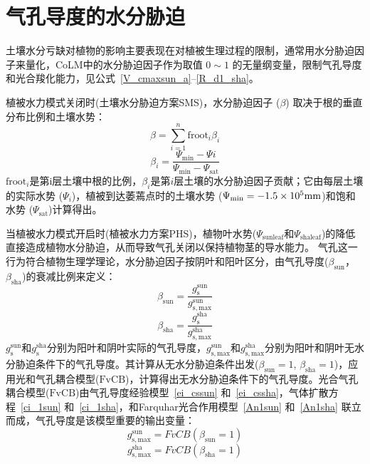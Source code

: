 \section{气孔导度的水分胁迫}\label{气孔导度的水分胁迫}
土壤水分亏缺对植物的影响主要表现在对植被生理过程的限制，通常用水分胁迫因子来量化，CoLM中的水分胁迫因子作为取值 $0\sim 1$ 的无量纲变量，限制气孔导度和光合羧化能力，见公式~\eqref{V_cmaxsun_a}--\eqref{R_d1_sha}。

植被水力模式关闭时(土壤水分胁迫方案SMS)，水分胁迫因子 ($\beta$) 取决于根的垂直分布比例和土壤水势：
\begin{equation}\label{beta_0}
  \beta=\sum_{i=1}^{n} {\mathrm {froot}}_i \beta_{i}
\end{equation}
%
\begin{equation}\label{beta_i}
  \beta_{i}=\frac{\Psi_{\mathrm{\min }}-\Psi i}{\Psi_{\mathrm{\min }}-\Psi_{\mathrm{s a t}}}
\end{equation}
${\mathrm {froot}}_i$是第i层土壤中根的比例，$\beta_i$是第$i$层土壤的水分胁迫因子贡献；它由每层土壤的实际水势 (${\Psi}_i$)，植被到达萎蔫点时的土壤水势 (${\Psi}_{\mathrm{min}}=-1.5\times 10^5 {\rm mm}$)和饱和水势 (${\Psi}_{\mathrm{sat}}$)计算得出。

当植被水力模式开启时(植被水力方案PHS)，植物叶水势($\Psi_{\mathrm{sunleaf}}$和$\Psi_{\mathrm{shaleaf}}$)的降低直接造成植物水分胁迫，从而导致气孔关闭以保持植物茎的导水能力。
气孔这一行为符合植物生理学理论，水分胁迫因子按阴叶和阳叶区分，由气孔导度($\beta_{\mathrm{sun}}$，$\beta_{\mathrm{sha}}$)的衰减比例来定义：
\begin{equation}\label{beta_sun}
  \beta_{\mathrm{sun}}=\frac{g_{\mathrm{s}}^{\mathrm {sun}}}{g_{\mathrm{s,max}}^{\mathrm {sun}}}
\end{equation}
\begin{equation}\label{beta_sha}
  \beta_{\mathrm{sha}}=\frac{g_{\mathrm{s}}^{\mathrm {sha}}}{g_{\mathrm{s,max}}^{\mathrm {sha}}}
\end{equation}
$g_{\mathrm{s}}^{\mathrm {sun}}$和$g_{\mathrm{s}}^{\mathrm {sha}}$分别为阳叶和阴叶实际的气孔导度，$g_{\mathrm{s,max}}^{\mathrm {sun}}$和$g_{\mathrm{s,max}}^{\mathrm {sha}}$分别为阳叶和阴叶无水分胁迫条件下的气孔导度。其计算从无水分胁迫条件出发($\beta_{\mathrm{sun}}=1$, $\beta_{\mathrm{sha}}=1$)，应用光和气孔耦合模型(${\mathrm {FvCB}}$)，计算得出无水分胁迫条件下的气孔导度。光合气孔耦合模型(${\mathrm {FvCB}}$)由气孔导度经验模型~\eqref{ei_cssun} 和~\eqref{ei_cssha}，气体扩散方程~\eqref{ci_1sun} 和~\eqref{ci_1sha}，和Farquhar光合作用模型~\eqref{An1sun} 和~\eqref{An1sha} 联立而成，气孔导度是该模型重要的输出变量：
\begin{equation}\label{gs_sunmax}
  g_{\mathrm{s,max}}^{\mathrm {sun}}=FvCB\left(\beta_{\mathrm{sun}}=1\right)
\end{equation}
\begin{equation}\label{gs_shamax}
  g_{\mathrm{s,max}}^{\mathrm {sha}}=FvCB\left(\beta_{\mathrm{sha}}=1\right)
\end{equation}


